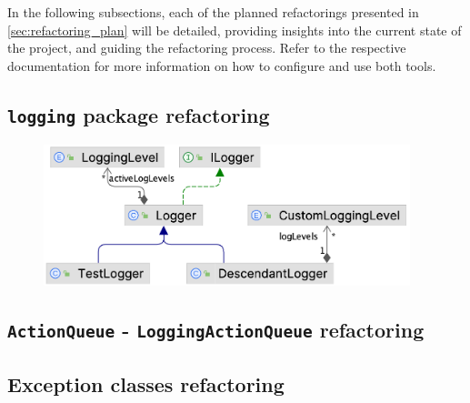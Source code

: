 In the following subsections, each of the planned refactorings presented in \autoref{sec:refactoring_plan} will be detailed, providing insights into the current state of the project, and guiding the refactoring process. Refer to the respective documentation for more information on how to configure and use both tools.

\subsection{\texttt{logging} package refactoring}

\begin{minipage}{0.5\linewidth}
  \begin{figure}
    \includegraphics[width=0.95\textwidth]{figures/logging_package/original.png}
    \caption{}
    \label{fig:}
  \end{figure}
\end{minipage}
\begin{minipage}{0.5\linewidth}
\end{minipage}

\subsection{\texttt{ActionQueue} - \texttt{LoggingActionQueue} refactoring}

\subsection{Exception classes refactoring}

